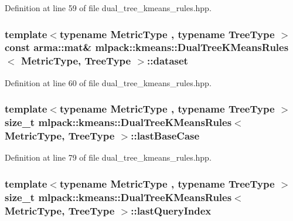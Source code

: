 Definition at line 59 of file dual\+\_\+tree\+\_\+kmeans\+\_\+rules.\+hpp.

\subsubsection[{dataset}]{\setlength{\rightskip}{0pt plus 5cm}template$<$typename Metric\+Type , typename Tree\+Type $>$ const arma\+::mat\& {\bf mlpack\+::kmeans\+::\+Dual\+Tree\+K\+Means\+Rules}$<$ Metric\+Type, Tree\+Type $>$\+::dataset\hspace{0.3cm}{\ttfamily [private]}}\label{classmlpack_1_1kmeans_1_1DualTreeKMeansRules_a0ed8d49c85ed4953e4cdd4d0d20bdd91}


Definition at line 60 of file dual\+\_\+tree\+\_\+kmeans\+\_\+rules.\+hpp.

\subsubsection[{last\+Base\+Case}]{\setlength{\rightskip}{0pt plus 5cm}template$<$typename Metric\+Type , typename Tree\+Type $>$ size\+\_\+t {\bf mlpack\+::kmeans\+::\+Dual\+Tree\+K\+Means\+Rules}$<$ Metric\+Type, Tree\+Type $>$\+::last\+Base\+Case\hspace{0.3cm}{\ttfamily [private]}}\label{classmlpack_1_1kmeans_1_1DualTreeKMeansRules_a5fe8def16428075ffad5cdafac98e949}


Definition at line 79 of file dual\+\_\+tree\+\_\+kmeans\+\_\+rules.\+hpp.

\subsubsection[{last\+Query\+Index}]{\setlength{\rightskip}{0pt plus 5cm}template$<$typename Metric\+Type , typename Tree\+Type $>$ size\+\_\+t {\bf mlpack\+::kmeans\+::\+Dual\+Tree\+K\+Means\+Rules}$<$ Metric\+Type, Tree\+Type $>$\+::last\+Query\+Index\hspace{0.3cm}{\ttfamily [private]}}\label{classmlpack_1_1kmeans_1_1DualTreeKMeansRules_a73869b6e1860b19310f75b7fce5755d3}


